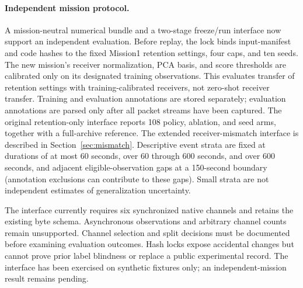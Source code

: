 \paragraph{Independent mission protocol.}
A mission-neutral numerical bundle and a two-stage freeze/run interface now support
an independent evaluation. Before replay, the lock binds input-manifest and code
hashes to the fixed Mission1 retention settings, four caps, and ten seeds. The
new mission's receiver normalization, PCA basis, and score thresholds are calibrated
only on its designated training observations. This evaluates transfer of retention
settings with training-calibrated receivers, not zero-shot receiver transfer.
Training and evaluation annotations are stored separately; evaluation annotations
are parsed only after all packet streams have been captured. The original retention-only interface reports 108 policy,
ablation, and seed arms, together with a full-archive reference. The extended
receiver-mismatch interface is described in Section~\ref{sec:mismatch}.
Descriptive event strata are fixed at durations of at most 60 seconds, over 60
through 600 seconds, and over 600 seconds, and adjacent eligible-observation gaps at a 150-second
boundary (annotation exclusions can contribute to these gaps). Small strata are not independent estimates of generalization uncertainty.

The interface currently requires six synchronized native channels and retains the
existing byte schema. Asynchronous observations and arbitrary channel counts remain
unsupported. Channel selection and split decisions must be documented before
examining evaluation outcomes. Hash locks expose accidental changes but cannot
prove prior label blindness or replace a public experimental record. The interface has been exercised on synthetic fixtures only; an independent-mission result remains pending.
